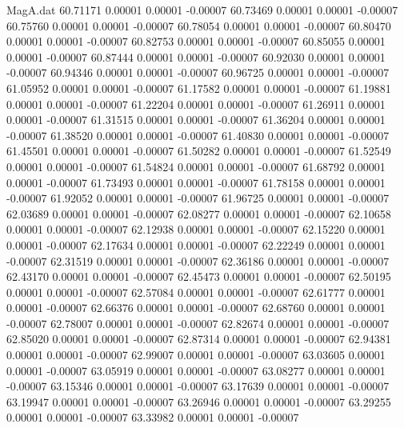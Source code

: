 \begin{filecontents}{MagA.dat}
  60.71171    0.00001    0.00001   -0.00007
  60.73469    0.00001    0.00001   -0.00007
  60.75760    0.00001    0.00001   -0.00007
  60.78054    0.00001    0.00001   -0.00007
  60.80470    0.00001    0.00001   -0.00007
  60.82753    0.00001    0.00001   -0.00007
  60.85055    0.00001    0.00001   -0.00007
  60.87444    0.00001    0.00001   -0.00007
  60.92030    0.00001    0.00001   -0.00007
  60.94346    0.00001    0.00001   -0.00007
  60.96725    0.00001    0.00001   -0.00007
  61.05952    0.00001    0.00001   -0.00007
  61.17582    0.00001    0.00001   -0.00007
  61.19881    0.00001    0.00001   -0.00007
  61.22204    0.00001    0.00001   -0.00007
  61.26911    0.00001    0.00001   -0.00007
  61.31515    0.00001    0.00001   -0.00007
  61.36204    0.00001    0.00001   -0.00007
  61.38520    0.00001    0.00001   -0.00007
  61.40830    0.00001    0.00001   -0.00007
  61.45501    0.00001    0.00001   -0.00007
  61.50282    0.00001    0.00001   -0.00007
  61.52549    0.00001    0.00001   -0.00007
  61.54824    0.00001    0.00001   -0.00007
  61.68792    0.00001    0.00001   -0.00007
  61.73493    0.00001    0.00001   -0.00007
  61.78158    0.00001    0.00001   -0.00007
  61.92052    0.00001    0.00001   -0.00007
  61.96725    0.00001    0.00001   -0.00007
  62.03689    0.00001    0.00001   -0.00007
  62.08277    0.00001    0.00001   -0.00007
  62.10658    0.00001    0.00001   -0.00007
  62.12938    0.00001    0.00001   -0.00007
  62.15220    0.00001    0.00001   -0.00007
  62.17634    0.00001    0.00001   -0.00007
  62.22249    0.00001    0.00001   -0.00007
  62.31519    0.00001    0.00001   -0.00007
  62.36186    0.00001    0.00001   -0.00007
  62.43170    0.00001    0.00001   -0.00007
  62.45473    0.00001    0.00001   -0.00007
  62.50195    0.00001    0.00001   -0.00007
  62.57084    0.00001    0.00001   -0.00007
  62.61777    0.00001    0.00001   -0.00007
  62.66376    0.00001    0.00001   -0.00007
  62.68760    0.00001    0.00001   -0.00007
  62.78007    0.00001    0.00001   -0.00007
  62.82674    0.00001    0.00001   -0.00007
  62.85020    0.00001    0.00001   -0.00007
  62.87314    0.00001    0.00001   -0.00007
  62.94381    0.00001    0.00001   -0.00007
  62.99007    0.00001    0.00001   -0.00007
  63.03605    0.00001    0.00001   -0.00007
  63.05919    0.00001    0.00001   -0.00007
  63.08277    0.00001    0.00001   -0.00007
  63.15346    0.00001    0.00001   -0.00007
  63.17639    0.00001    0.00001   -0.00007
  63.19947    0.00001    0.00001   -0.00007
  63.26946    0.00001    0.00001   -0.00007
  63.29255    0.00001    0.00001   -0.00007
  63.33982    0.00001    0.00001   -0.00007

\end{filecontents}
